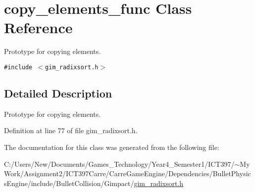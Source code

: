 \hypertarget{classcopy__elements__func}{
\section{copy\_\-elements\_\-func Class Reference}
\label{classcopy__elements__func}
}
Prototype for copying elements.  


{\tt \#include $<$gim\_\-radixsort.h$>$}



\subsection{Detailed Description}
Prototype for copying elements. 

Definition at line 77 of file gim\_\-radixsort.h.

The documentation for this class was generated from the following file:\begin{CompactItemize}
\item 
C:/Users/New/Documents/Games\_\-Technology/Year4\_\-Semester1/ICT397/$\sim$My Work/Assignment2/ICT397Carre/CarreGameEngine/Dependencies/BulletPhysicsEngine/include/BulletCollision/Gimpact/\hyperlink{gim__radixsort_8h}{gim\_\-radixsort.h}\end{CompactItemize}
